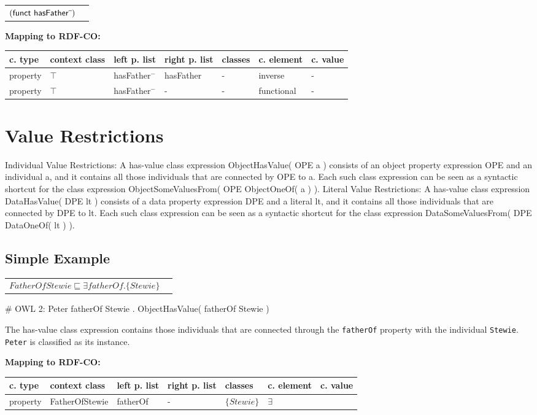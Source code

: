 \documentclass{llncs}
\newcommand{\ms}[1]{\texttt{#1}}
\newenvironment{gcotable}{
  \scriptsize
  \sffamily
  \vspace{0cm}
	\begin{center}
	\textbf{\vspace{0.4cm}Mapping to RDF-CO:} \\
  \begin{tabular}{l|l|l|l|l|l|l}
	\hline
  \textbf{c. type} & \textbf{context class} & \textbf{left p. list} & \textbf{right p. list} & \textbf{classes} & \textbf{c. element} & \textbf{c. value} \\
  \hline

}{
  \hline
  \end{tabular}
	\end{center}
}
\newenvironment{DL}{
  \vspace{0cm}
	\begin{center}
  \begin{tabular}{r l}

}{
  \end{tabular}
	\end{center}
}
\begin{document}
\begin{DL}
$(\textsf{funct } \textsf{hasFather}\sp{\overline{\ }})$
\end{DL}

\begin{gcotable}
property & $\top$ & hasFather$^{-}$ & hasFather & - & inverse & - \\
property & $\top$ & hasFather$^{-}$ & - & - & functional & - \\
\end{gcotable}

\section{Value Restrictions}

Individual Value Restrictions: A has-value class expression ObjectHasValue( OPE a ) consists of an object property expression OPE and an individual a, and it contains all those individuals that are connected by OPE to a. Each such class expression can be seen as a syntactic shortcut for the class expression ObjectSomeValuesFrom( OPE ObjectOneOf( a ) ). 
Literal Value Restrictions: A has-value class expression DataHasValue( DPE lt ) consists of a data property expression DPE and a literal lt, and it contains all those individuals that are connected by DPE to lt. Each such class expression can be seen as a syntactic shortcut for the class expression DataSomeValuesFrom( DPE DataOneOf( lt ) ).

\subsection{Simple Example}

\begin{DL}
$FatherOfStewie \sqsubseteq \exists fatherOf.\{Stewie\}$
\end{DL}

\begin{ex}
# OWL 2:
Peter fatherOf Stewie . 
ObjectHasValue( fatherOf Stewie )
\end{ex}

The has-value class expression contains those individuals that are connected through the \ms{fatherOf} property with the individual \ms{Stewie}.
\ms{Peter} is classified as its instance.

\begin{gcotable}
property & FatherOfStewie & fatherOf & - & $\{Stewie\}$ & $\exists$ \\
\end{gcotable}
\end{document}

